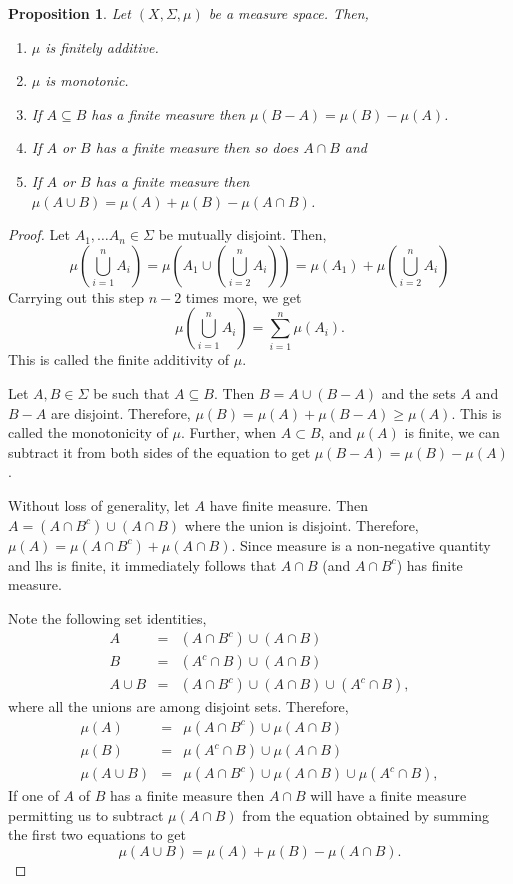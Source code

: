 \documentclass{article}
\theoremstyle{plain}
\numberwithin{thm}{section}
\theoremstyle{plain}
\newtheorem{prop}{Proposition}
\numberwithin{prop}{section}
\theoremstyle{definition}
\numberwithin{defn}{section}
\theoremstyle{remark}
\numberwithin{equation}{section}
\begin{document}
\begin{prop}\label{s1p4}Let $(X, \Sigma, \mu)$ be a measure space. Then,
\begin{enumerate}
\item $\mu$ is finitely additive.
\item $\mu$ is monotonic.
\item If $A \subseteq B$ has a finite measure then $\mu(B - A) = \mu(B) - \mu(A)$.
\item If $A$ or $B$ has a finite measure then so does $A \cap B$ and
\item If $A$ or $B$ has a finite measure then $\mu(A \cup B) = \mu(A) + \mu(B) -
\mu(A \cap B)$.
\end{enumerate}
\end{prop}
\begin{proof}
Let $A_1, \ldots A_n \in \Sigma$ be mutually disjoint. Then, 
\[
\mu\left(\bigcup_{i=1}^n A_i\right) = 
\mu\left( A_1 \cup \left(\bigcup_{i=2}^n A_i\right)\right) = 
\mu(A_1) + \mu\left(\bigcup_{i=2}^n A_i\right)
\]
Carrying out this step $n - 2$ times more, we get
\[
\mu\left(\bigcup_{i=1}^n A_i\right) = \sum_{i=1}^n \mu(A_i).
\]
This is called the finite additivity of $\mu$.

Let $A, B \in \Sigma$ be such that $A \subseteq B$. Then $B = A \cup (B - A)$
and the sets $A$ and $B - A$ are disjoint. Therefore, $\mu(B) = \mu(A) + 
\mu(B - A) \ge \mu(A)$.
This is called the monotonicity of $\mu$. Further, when $A \subset B$, and 
$\mu(A)$ is finite, we can subtract it from both sides of the equation to get
$\mu(B - A) = \mu(B) - \mu(A)$.

Without loss of generality, let $A$ have finite measure. Then $A = (A \cap B^c)
\cup (A \cap B)$ where the union is disjoint. Therefore, $\mu(A) = \mu(A \cap B^c)
+ \mu(A \cap B)$. Since measure is a non-negative quantity and lhs is finite, it
immediately follows that $A \cap B$ (and $A \cap B^c$) has finite measure.

Note the following set identities,
\begin{eqnarray*}
A &=& (A \cap B^c) \cup (A \cap B) \\
B &=& (A^c \cap B) \cup (A \cap B) \\
A \cup B &=& (A \cap B^c) \cup (A \cap B) \cup (A^c \cap B),
\end{eqnarray*}
where all the unions are among disjoint sets. Therefore,
\begin{eqnarray*}
\mu(A) &=& \mu(A \cap B^c) \cup \mu(A \cap B) \\
\mu(B) &=& \mu(A^c \cap B) \cup \mu(A \cap B) \\
\mu(A \cup B) &=& \mu(A \cap B^c) \cup \mu(A \cap B) \cup \mu(A^c \cap B),
\end{eqnarray*}
If one of $A$ of $B$ has a finite measure then $A \cap B$ will have a finite
measure permitting us to subtract $\mu(A \cap B)$ from the equation obtained
by summing the first two equations to get
\[
\mu(A \cup B) = \mu(A) + \mu(B) - \mu(A \cap B).
\]
\end{proof}
\end{document}
